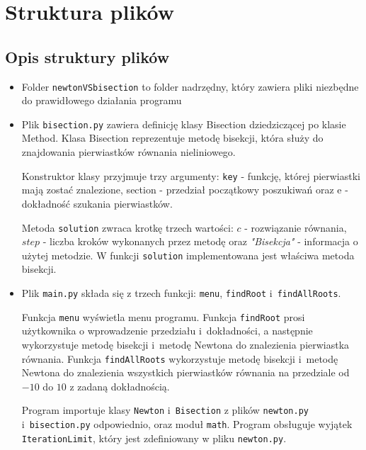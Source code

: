 \documentclass[12pt]{article}
\begin{document}
\section{Struktura plików}
\subsection{Opis struktury plików}
\begin{itemize}
    \item Folder \verb|newtonVSbisection| to folder nadrzędny, który zawiera pliki niezbędne do prawidłowego działania programu
    \item Plik \verb|bisection.py| zawiera definicję klasy Bisection dziedziczącej po klasie Method. Klasa Bisection reprezentuje metodę bisekcji, która służy do znajdowania pierwiastków równania nieliniowego.

    Konstruktor klasy przyjmuje trzy argumenty: \verb|key| - funkcję, której pierwiastki mają zostać znalezione, section - przedział początkowy poszukiwań oraz e - dokładność szukania pierwiastków.

Metoda \verb|solution| zwraca krotkę trzech wartości: $c$ - rozwiązanie równania, $step$ - liczba kroków wykonanych przez metodę oraz \textit{"Bisekcja"} - informacja o użytej metodzie. W funkcji \verb|solution| implementowana jest właściwa metoda bisekcji.

    \item Plik \verb|main.py| składa się z trzech funkcji: \verb|menu|, \verb|findRoot| i~\verb|findAllRoots|.

    Funkcja \verb|menu| wyświetla menu programu. Funkcja \verb|findRoot| prosi użytkownika o wprowadzenie przedziału i~dokładności, a następnie wykorzystuje metodę bisekcji i~metodę Newtona do znalezienia pierwiastka równania. Funkcja \verb|findAllRoots| wykorzystuje metodę bisekcji i~metodę Newtona do znalezienia wszystkich pierwiastków równania na przedziale od $-10$ do $10$ z zadaną dokładnością.

    Program importuje klasy \verb|Newton| i~\verb|Bisection| z plików \verb|newton.py| i~\verb|bisection.py| odpowiednio, oraz moduł \verb|math|. Program obsługuje wyjątek \verb|IterationLimit|, który jest zdefiniowany w pliku \verb|newton.py|.


\end{itemize}
\end{document}
